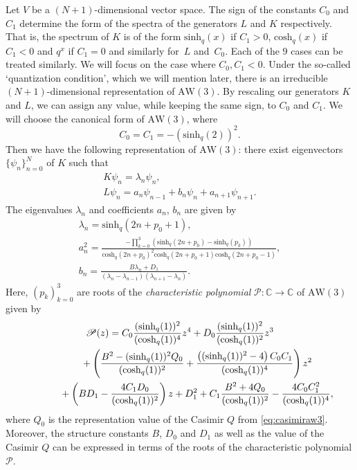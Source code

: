\documentclass[10pt,a4paper]{amsart}
\numberwithin{equation}{section}
\newcommand{\CC}{\mathbb{C}}
\newcommand{\aw}{\mathrm{AW}\!\left(3\right)}
\newcommand{\chq}{\mathrm{cosh}_q}
\newcommand{\shq}{\mathrm{sinh}_q}
\begin{document}
Let $V$ be a $(N+1)$-dimensional vector space. The sign of the constants $C_0$ and $C_1$ determine the form of the spectra of the generators $L$ and $K$ respectively. That is, the spectrum of $K$ is of the form $\shq(x)$ if $C_1>0$, $\chq(x)$ if $C_1 <0$ and $q^x$ if $C_1=0$ and similarly for~$L$ and~$C_0$. Each of the 9 cases can be treated similarly. We will focus on the case where $C_0,C_1 <0$. Under the so-called `quantization condition', which we will mention later, there is an irreducible $(N+1)$-dimensional representation of $\aw$. By rescaling our generators $K$ and $L$, we can assign any value, while keeping the same sign, to $C_0$ and $C_1$. We will choose the canonical form of $\aw$, where
\[
C_0=C_1=-(\shq(2))^2.
\]
Then we have the following representation of $\aw$: there exist eigenvectors $\{\psi_n\}_{n=0}^N$ of $K$ such that
\begin{gather}
	K\psi_n=\lambda_n \psi_n,\label{eq:1vd5}\\
	L\psi_n=a_n\psi_{n-1}+b_n\psi_n + a_{n+1}\psi_{n+1}.\label{eq:anbntri}
\end{gather}
The eigenvalues $\lambda_n$ and coefficients $a_n$, $b_n$ are given by
\begin{gather}
	\lambda_n= \shq(2n+p_0+1),\label{eq:3vd5}\\
	a_n^2=\frac{-\prod_{k=0}^3(\shq(2n+p_0)-\shq(p_k))}{\chq(2n+p_0)^2\chq(2n+p_0+1)\chq(2n+p_0-1)},\label{eq:4vd5}\\
	b_n = \frac{B\lambda_n+D_1}{(\lambda_{n}-\lambda_{n-1})(\lambda_{n+1}-\lambda_n)}\label{eq:5vd5}.
\end{gather}
Here, $(p_k)_{k=0}^3$ are roots of the \textit{characteristic polynomial} $\mathscr{P}\colon \CC\to\CC$ of $\aw$ given by
\begin{gather}
 \mathscr{P}(z)= C_0\frac{(\shq(1))^2}{(\chq(1))^4} z^4 +D_0\frac{(\shq(1))^2}{(\chq(1))^2}z^3\nonumber\\
\hphantom{\mathscr{P}(z)=}{}
+\left(\frac{B^2-(\shq(1))^2Q_0}{(\chq(1))^2}+\frac{\left((\shq(1))^2-4\right)C_0C_1}{(\chq(1))^4}\right)z^2 \nonumber\\
\hphantom{\mathscr{P}(z)=}{}
+\left(BD_1-\frac{4C_1D_0}{(\chq(1))^2}\right)z +D_1^2+C_1\frac{B^2+4Q_0}{(\chq(1))^2}-\frac{4C_0C_1^2}{(\chq(1))^4}, \label{eq:awpol}
\end{gather}
where $Q_0$ is the representation value of the Casimir $Q$ from \eqref{eq:casimiraw3}. Moreover, the structure constants $B$, $D_0$ and $D_1$ as well as the value of the Casimir $Q$ can be expressed in terms of the roots of the characteristic polynomial $\mathscr{P}$.
\end{document}
